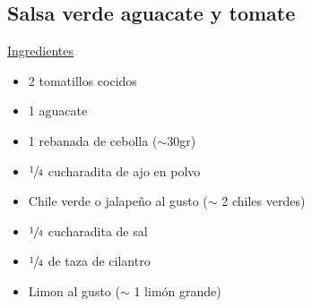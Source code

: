 \subsection{Salsa verde aguacate y tomate}

\underline{Ingredientes}

\begin{itemize}
\item 2 tomatillos cocidos
\item 1 aguacate
\item 1 rebanada de cebolla ($\sim$30gr)
\item $\sfrac{1}{4}$ cucharadita de ajo en polvo
\item Chile verde o jalapeño al gusto ($\sim$ 2 chiles verdes)
\item $\sfrac{1}{4}$ cucharadita de sal
\item $\sfrac{1}{4}$ de taza de cilantro
\item Limon al gusto ($\sim$ 1 lim\'on grande)
\end{itemize}
